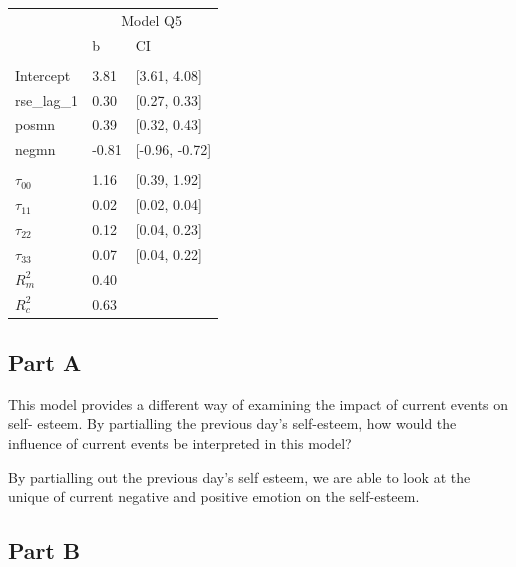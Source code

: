 \documentclass[]{article}
\begin{document}
\begin{table}[H]
\centering
\begin{tabular}{lll}
\toprule
\multicolumn{1}{c}{ } & \multicolumn{2}{c}{Model Q5} \\
\cmidrule(l{2pt}r{2pt}){2-3}
 & b & CI\\
\midrule
\addlinespace[0.3em]
\multicolumn{3}{l}{\textbf{Fixed}}\\
\hspace{1em}Intercept & 3.81 & [3.61, 4.08]\\
\hspace{1em}rse\_lag\_1 & 0.30 & [0.27, 0.33]\\
\hspace{1em}posmn & 0.39 & [0.32, 0.43]\\
\hspace{1em}negmn & -0.81 & [-0.96, -0.72]\\
\addlinespace[0.3em]
\multicolumn{3}{l}{\textbf{Random}}\\
\hspace{1em}$\tau_{00}$ & 1.16 & [0.39, 1.92]\\
\hspace{1em}$\tau_{11}$ & 0.02 & [0.02, 0.04]\\
\hspace{1em}$\tau_{22}$ & 0.12 & [0.04, 0.23]\\
\hspace{1em}$\tau_{33}$ & 0.07 & [0.04, 0.22]\\
$R^2_m$ & 0.40 & \\
$R^2_c$ & 0.63 & \\
\bottomrule
\end{tabular}
\end{table}

\subsection{Part A}\label{part-a-3}

This model provides a different way of examining the impact of current
events on self- esteem. By partialling the previous day's self-esteem,
how would the influence of current events be interpreted in this model?

By partialling out the previous day's self esteem, we are able to look
at the unique of current negative and positive emotion on the
self-esteem.

\subsection{Part B}\label{part-b-3}
\end{document}
